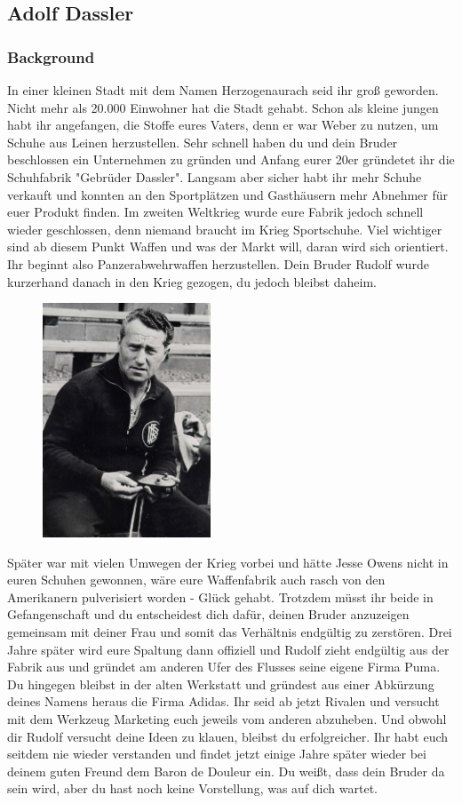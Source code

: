 \documentclass[12pt, a4paper, openany]{report}
\begin{document}
\subsection{Adolf Dassler}
\subsubsection{Background}
In einer kleinen Stadt mit dem Namen Herzogenaurach seid ihr groß geworden. Nicht mehr als 20.000 Einwohner hat die Stadt gehabt. Schon als kleine jungen habt ihr angefangen, die Stoffe eures Vaters, denn er war Weber zu nutzen, um Schuhe aus Leinen herzustellen. Sehr schnell haben du und dein Bruder beschlossen ein Unternehmen zu gründen und Anfang eurer 20er gründetet ihr die Schuhfabrik "Gebrüder Dassler". Langsam aber sicher habt ihr mehr Schuhe verkauft und konnten an den Sportplätzen und Gasthäusern mehr Abnehmer für euer Produkt finden. Im zweiten Weltkrieg wurde eure Fabrik jedoch schnell wieder geschlossen, denn niemand braucht im Krieg Sportschuhe. Viel wichtiger sind ab diesem Punkt Waffen und was der Markt will, daran wird sich orientiert. Ihr beginnt also Panzerabwehrwaffen herzustellen. Dein Bruder Rudolf wurde kurzerhand danach in den Krieg gezogen, du jedoch bleibst daheim. 

\begin{figure}[h!]
\centering
\includegraphics[width=5cm]{Adolf Dassler.jpg}
\end{figure}

Später war mit vielen Umwegen der Krieg vorbei und hätte Jesse Owens nicht in euren Schuhen gewonnen, wäre eure Waffenfabrik auch rasch von den Amerikanern pulverisiert worden - Glück gehabt. Trotzdem müsst ihr beide in Gefangenschaft und du entscheidest dich dafür, deinen Bruder anzuzeigen gemeinsam mit deiner Frau und somit das Verhältnis endgültig zu zerstören. Drei Jahre später wird eure Spaltung dann offiziell und Rudolf zieht endgültig aus der Fabrik aus und gründet am anderen Ufer des Flusses seine eigene Firma Puma. Du hingegen bleibst in der alten Werkstatt und gründest aus einer Abkürzung deines Namens heraus die Firma Adidas. Ihr seid ab jetzt Rivalen und versucht mit dem Werkzeug Marketing euch jeweils vom anderen abzuheben. Und obwohl dir Rudolf versucht deine Ideen zu klauen, bleibst du erfolgreicher. Ihr habt euch seitdem nie wieder verstanden und findet jetzt einige Jahre später wieder bei deinem guten Freund dem Baron de Douleur ein. Du weißt, dass dein Bruder da sein wird, aber du hast noch keine Vorstellung, was auf dich wartet.
\end{document}
